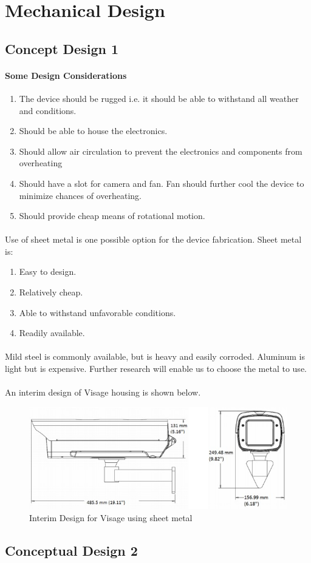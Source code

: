 \section{Mechanical Design}
\subsection{Concept Design 1}
\paragraph{Some Design Considerations}
\begin{enumerate}
\item The device should be rugged i.e. it should be able to withstand all weather and conditions.
\item Should be able to house the electronics.
\item Should allow air circulation to prevent the electronics and components from overheating
\item Should have a slot for camera and fan. Fan should further cool the device to minimize chances of overheating.
\item Should provide cheap means of rotational motion.
\end{enumerate}
\paragraph{}Use of sheet metal is one possible option for the device fabrication. Sheet metal is:
\begin{enumerate}
\item Easy to design.
\item Relatively cheap.
\item Able to withstand unfavorable conditions.
\item Readily available.
\end{enumerate} 
\paragraph{}Mild steel is commonly available, but is heavy and easily corroded. Aluminum is light but is expensive. Further research will enable us to choose the metal to use.
\paragraph{} An interim design of Visage housing is shown below.
\begin{center}
\begin{figure}[!h]
\centering
\includegraphics{Figures/Visage}
\caption{Interim Design for Visage using sheet metal}
\end{figure}
\end{center}
\clearpage
\subsection{Conceptual Design 2}
